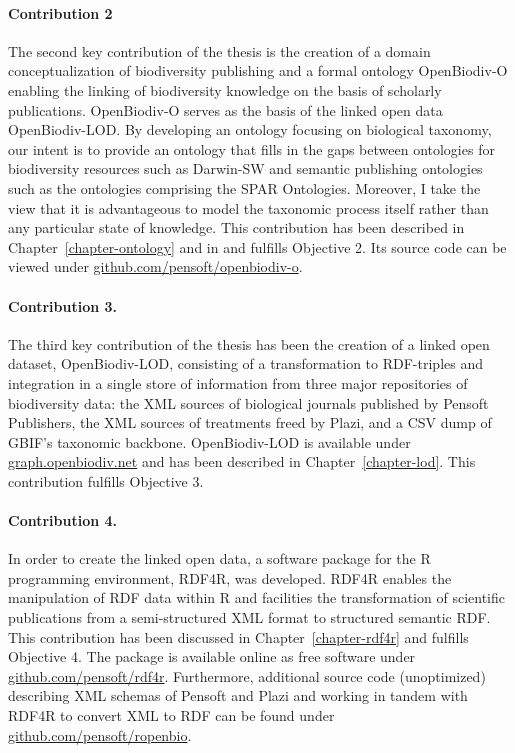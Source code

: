 \paragraph{Contribution 2} The second key contribution of the thesis is the creation of a domain conceptualization of biodiversity publishing and a formal ontology OpenBiodiv-O enabling the linking of biodiversity knowledge on the basis of scholarly publications. OpenBiodiv-O serves as the basis of the linked open data OpenBiodiv-LOD. By developing an ontology focusing on biological taxonomy, our intent is to provide an ontology that fills in the gaps between ontologies for biodiversity resources such as Darwin-SW and semantic publishing ontologies such as the ontologies comprising the SPAR Ontologies. Moreover, I take the view that it is advantageous to model the taxonomic process itself rather than any particular state of knowledge. This contribution has been described in Chapter~\ref{chapter-ontology} and in \cite{senderov_openbiodiv-o:_2018} and fulfills Objective 2. Its source code can be viewed under \href{https://github.com/pensoft/openbiodiv-o}{github.com/pensoft/openbiodiv-o}.

\paragraph{Contribution 3.} The third key contribution of the thesis has been the creation of a linked open dataset, OpenBiodiv-LOD, consisting of a transformation to RDF-triples and integration in a single store of information from three major repositories of biodiversity data: the XML sources of biological journals published by Pensoft Publishers, the XML sources of treatments freed by Plazi, and a CSV dump of GBIF's taxonomic backbone. OpenBiodiv-LOD is available under \href{http://graph.openbiodiv.net}{\url{graph.openbiodiv.net}} and has been described in Chapter~\ref{chapter-lod}. This contribution fulfills Objective 3.

\paragraph{Contribution 4.} In order to  create the linked open data, a software package for the R programming environment, RDF4R, was developed. RDF4R enables the manipulation of RDF data within R and facilities the transformation of scientific publications from a semi-structured XML format to structured semantic RDF. This contribution has been discussed in Chapter~\ref{chapter-rdf4r} and fulfills Objective 4. The package is available online as free software under \href{http://github.com/pensoft/rdf4r}{\url{github.com/pensoft/rdf4r}}. Furthermore, additional source code (unoptimized) describing XML schemas of Pensoft and Plazi and working in tandem with RDF4R to convert XML to RDF can be found under \href{http://github.com/pensoft/ropenbio}{\url{github.com/pensoft/ropenbio}}.

